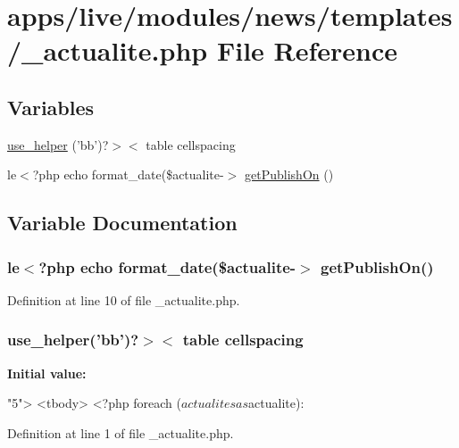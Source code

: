 \hypertarget{live_2modules_2news_2templates_2__actualite_8php}{\section{apps/live/modules/news/templates/\-\_\-actualite.php File Reference}
\label{live_2modules_2news_2templates_2__actualite_8php}
}
\subsection*{Variables}
\begin{DoxyCompactItemize}
\item 
\hyperlink{live_2modules_2news_2templates_2__actualite_8php_a5f0973bffa71cc7da4428e1b6f8b7a73}{use\-\_\-helper} ('bb')?$>$$<$ table cellspacing
\item 
le$<$?php echo format\-\_\-date(\$actualite-\/$>$ \hyperlink{live_2modules_2news_2templates_2__actualite_8php_a3c158fe87c824684f8b25431b03eb836}{get\-Publish\-On} ()
\end{DoxyCompactItemize}


\subsection{Variable Documentation}
\hypertarget{live_2modules_2news_2templates_2__actualite_8php_a3c158fe87c824684f8b25431b03eb836}{
\subsubsection[{get\-Publish\-On}]{\setlength{\rightskip}{0pt plus 5cm}le$<$?php echo format\-\_\-date(\$actualite-\/$>$ get\-Publish\-On()}}\label{live_2modules_2news_2templates_2__actualite_8php_a3c158fe87c824684f8b25431b03eb836}


Definition at line 10 of file \-\_\-actualite.\-php.

\hypertarget{live_2modules_2news_2templates_2__actualite_8php_a5f0973bffa71cc7da4428e1b6f8b7a73}{
\subsubsection[{use\-\_\-helper}]{\setlength{\rightskip}{0pt plus 5cm}use\-\_\-helper('bb')?$>$$<$ table cellspacing}}\label{live_2modules_2news_2templates_2__actualite_8php_a5f0973bffa71cc7da4428e1b6f8b7a73}
{\bfseries Initial value\-:}
\begin{DoxyCode}
\textcolor{stringliteral}{"5"}>
  <tbody>
    <?php \textcolor{keywordflow}{foreach} ($actualites as $actualite):
\end{DoxyCode}


Definition at line 1 of file \-\_\-actualite.\-php.

